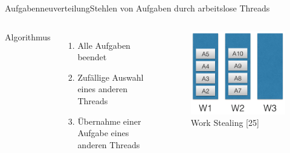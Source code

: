 \documentclass{beamer}
\begin{document}
\begin{frame}{Aufgabenneuverteilung}{Stehlen von Aufgaben durch arbeitslose Threads}
\begin{columns}

        Algorithmus
        \begin{enumerate}
        \item Alle Aufgaben beendet
        \item Zuf\"allige Auswahl eines anderen Threads
        \item \"Ubernahme einer Aufgabe eines anderen Threads
        \end{enumerate}

        \begin{figure}
        \centering
        \includegraphics[width=1\columnwidth]{./assets/outOfWork.png}
        \caption{Work Stealing \cite{Herlihy1}[25]}
        \label{fig:my_label}
        \end{figure}
        
        
    
\end{columns}

\end{frame}
\end{document}
